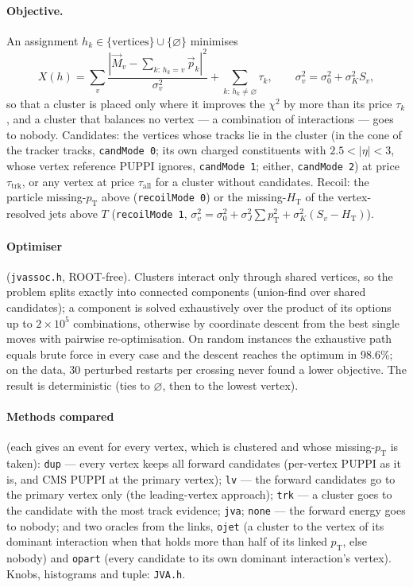 \documentclass[11pt,a4paper]{article}
\newcommand{\pt}{p_{\mathrm{T}}}
\begin{document}
\paragraph{Objective.} An assignment $h_k \in \{\text{vertices}\} \cup \{\varnothing\}$
minimises
\begin{equation}
X(h) = \sum_v \frac{|\vec M_v - \sum_{k:\,h_k=v} \vec p_k|^2}{\sigma_v^2}
     + \sum_{k:\,h_k\ne\varnothing} \tau_k ,\qquad
\sigma_v^2 = \sigma_0^2 + \sigma_K^2 S_v ,
\end{equation}
so that a cluster is placed only where it improves the $\chi^2$ by more than its
price $\tau_k$, and a cluster that balances no vertex --- a combination of
interactions --- goes to nobody. Candidates: the vertices whose tracks lie in
the cluster (in the cone of the tracker tracks, \texttt{candMode 0}; its own
charged constituents with $2.5<|\eta|<3$, whose vertex reference PUPPI ignores,
\texttt{candMode 1}; either, \texttt{candMode 2}) at price $\tau_{\mathrm{trk}}$,
or any vertex at price $\tau_{\mathrm{all}}$ for a cluster without candidates.
Recoil: the particle missing-$\pt$ above (\texttt{recoilMode 0}) or the
missing-$H_{\mathrm{T}}$ of the vertex-resolved jets above $T$
(\texttt{recoilMode 1}, $\sigma_v^2 = \sigma_0^2 + \sigma_J^2\sum \pt^2 +
\sigma_K^2(S_v - H_{\mathrm{T}})$).

\paragraph{Optimiser} (\texttt{jvassoc.h}, ROOT-free). Clusters interact only
through shared vertices, so the problem splits exactly into connected
components (union-find over shared candidates); a component is solved
exhaustively over the product of its options up to $2\times10^5$ combinations,
otherwise by coordinate descent from the best single moves with pairwise
re-optimisation. On random instances the exhaustive path equals brute force in
every case and the descent reaches the optimum in 98.6\%; on the data, 30
perturbed restarts per crossing never found a lower objective. The result is
deterministic (ties to $\varnothing$, then to the lowest vertex).

\paragraph{Methods compared} (each gives an event for every vertex, which is
clustered and whose missing-$\pt$ is taken):
\texttt{dup} --- every vertex keeps all forward candidates (per-vertex PUPPI as
it is, and CMS PUPPI at the primary vertex); \texttt{lv} --- the forward
candidates go to the primary vertex only (the leading-vertex approach);
\texttt{trk} --- a cluster goes to the candidate with the most track evidence;
\texttt{jva}; \texttt{none} --- the forward energy goes to nobody; and two
oracles from the links, \texttt{ojet} (a cluster to the vertex of its dominant
interaction when that holds more than half of its linked $\pt$, else nobody)
and \texttt{opart} (every candidate to its own dominant interaction's vertex).
Knobs, histograms and tuple: \texttt{JVA.h}.
\end{document}
